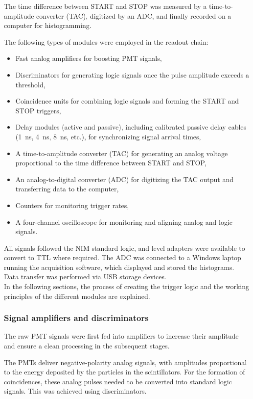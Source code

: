 \documentclass[11pt,a4paper]{article}
\begin{document}
The time difference between START and STOP was measured by a time-to-amplitude converter (TAC), digitized by an ADC,
and finally recorded on a computer for histogramming.

The following types of modules were employed in the readout chain:
\begin{itemize}
\item Fast analog amplifiers for boosting PMT signals,
\item Discriminators for generating logic signals once the pulse amplitude exceeds a threshold,
\item Coincidence units for combining logic signals and forming the START and STOP triggers,
\item Delay modules (active and passive), including calibrated passive delay cables (1~ns, 4~ns, 8~ns, etc.), for synchronizing signal arrival times,
\item A time-to-amplitude converter (TAC) for generating an analog voltage proportional to the time difference between START and STOP,
\item An analog-to-digital converter (ADC) for digitizing the TAC output and transferring data to the computer,
\item Counters for monitoring trigger rates,
\item A four-channel oscilloscope for monitoring and aligning analog and logic signals.
\end{itemize}

All signals followed the NIM standard logic, and level adapters were available to convert to TTL where required.
The ADC was connected to a Windows laptop running the acquisition software, which displayed and stored the histograms. Data transfer was performed via USB storage devices.\\

In the following sections, the process of creating the trigger logic and the working principles of the different modules are explained.

\subsubsection{Signal amplifiers and discriminators}

The raw PMT signals were first fed into amplifiers to increase their amplitude and ensure a clean processing in the subsequent stages. 

The PMTs deliver negative-polarity analog signals, with amplitudes proportional to the energy deposited by the particles in the scintillators. For the formation of coincidences, these analog pulses needed to be converted into standard logic signals. This was achieved using discriminators. 
\end{document}
